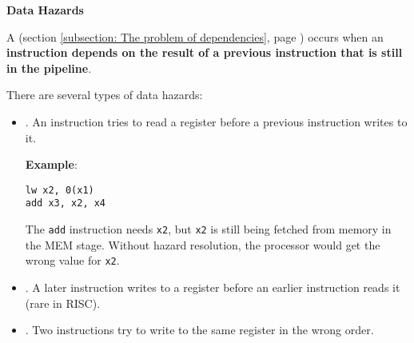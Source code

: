 \highspace
\begin{flushleft}
    \textcolor{Red2}{ \textbf{Data Hazards}}
\end{flushleft}
A  (section \ref{subsection: The problem of dependencies}, page \pageref{subsection: The problem of dependencies}) occurs when an \textbf{instruction depends on the result of a previous instruction that is still in the pipeline}.

\highspace
There are several types of data hazards:
\begin{itemize}
    \item {}. An instruction tries to read a register before a previous instruction writes to it.

    \textcolor{Green3}{ \textbf{Example}}:
    \begin{lstlisting}[language=riscv]
lw x2, 0(x1)
add x3, x2, x4\end{lstlisting}
    The \texttt{add} instruction needs \texttt{x2}, but \texttt{x2} is still being fetched from memory in the MEM stage. Without hazard resolution, the processor would get the wrong value for \texttt{x2}.

    \item {}. A later instruction writes to a register before an earlier instruction reads it (rare in RISC).

    \item {}. Two instructions try to write to the same register in the wrong order.
\end{itemize}